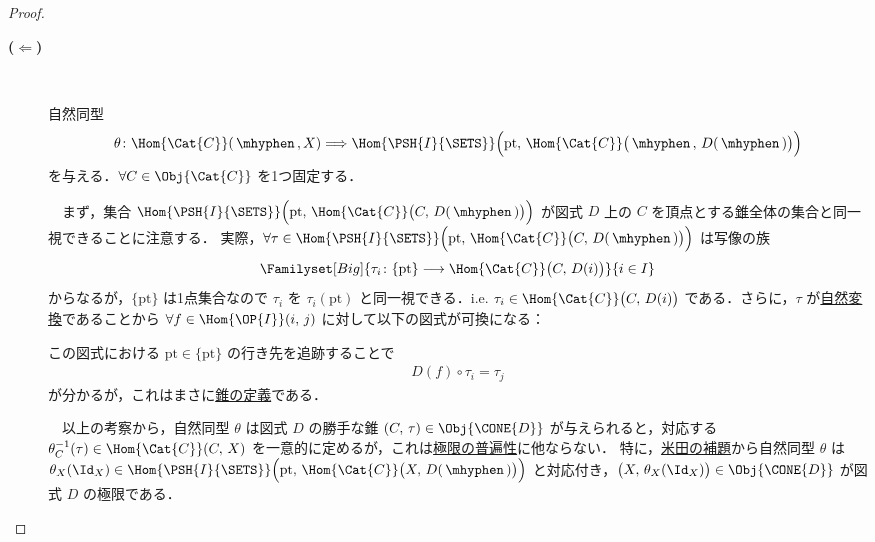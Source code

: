 \documentclass[TQFT_main]{subfiles}
\begin{document}
\begin{proof}
    \begin{description}
        \item[\textbf{($\bm{\Longleftarrow}$)}]　
        
        自然同型
        \begin{align}
            \theta \colon \Hom{\Cat{C}}(\, \mhyphen \,, X) \Longrightarrow \Hom{\PSH{I}{\SETS}} \Bigl( \mathrm{pt},\, \Hom{\Cat{C}}\bigl(\, \mhyphen \,,\, D(\, \mhyphen \,) \bigr)  \Bigr)
        \end{align}
        を与える．$\forall C \in \Obj{\Cat{C}}$ を1つ固定する．
        
        　まず，集合 $\Hom{\PSH{I}{\SETS}} \Bigl( \mathrm{pt},\, \Hom{\Cat{C}}\bigl(C,\, D(\, \mhyphen \,) \bigr)  \Bigr)$ が図式 $D$ 上の $C$ を頂点とする\hyperref[def:Cone]{錐}全体の集合と同一視できることに注意する．
        実際，$\forall \tau \in \Hom{\PSH{I}{\SETS}} \Bigl( \mathrm{pt},\, \Hom{\Cat{C}}\bigl(C,\, D(\, \mhyphen \,) \bigr)  \Bigr)$
        は写像の族
        \begin{align}
            \Familyset[Big]{\tau_i \colon \{\mathrm{pt}\} \lto \Hom{\Cat{C}} \bigl( C,\, D(i) \bigr) }{i \in I}
        \end{align}
        からなるが，$\{\mathrm{pt}\}$ は1点集合なので $\tau_i$ を $\tau_i (\mathrm{pt})$ と同一視できる．i.e. $\tau_i \in \Hom{\Cat{C}} \bigl( C,\, D(i) \bigr)$ である．さらに，$\tau$ が\hyperref[def:nat]{自然変換}であることから
        $\forall f \in \Hom{\OP{I}}(i,\, j)$ に対して以下の図式が可換になる：
        \begin{center}
        \end{center}
        この図式における $\mathrm{pt} \in \{\mathrm{pt}\}$ の行き先を追跡することで
        \begin{align}
            D(f) \circ \tau_i = \tau_j
        \end{align}
        が分かるが，これはまさに\hyperref[def:Cone]{錐の定義}である．

        　以上の考察から，自然同型 $\theta$ は図式 $D$ の勝手な錐 $(C,\, \tau) \in \Obj{\CONE{D}}$ が与えられると，対応する $\theta_C^{-1}(\tau) \in \Hom{\Cat{C}}(C,\, X)$ を一意的に定めるが，これは\hyperref[def:lim]{極限の普遍性}に他ならない．
        特に，\hyperref[lem:Yoneda]{米田の補題}から自然同型 $\theta$ は $\theta_X(\Id_X) \in \Hom{\PSH{I}{\SETS}} \Bigl( \mathrm{pt},\, \Hom{\Cat{C}}\bigl(X,\, D(\, \mhyphen \,) \bigr)  \Bigr)$ と対応付き，$\bigl( X,\, \theta_X(\Id_X) \bigr) \in \Obj{\CONE{D}}$ が図式 $D$ の極限である．


\end{description}
\end{proof}
\end{document}
